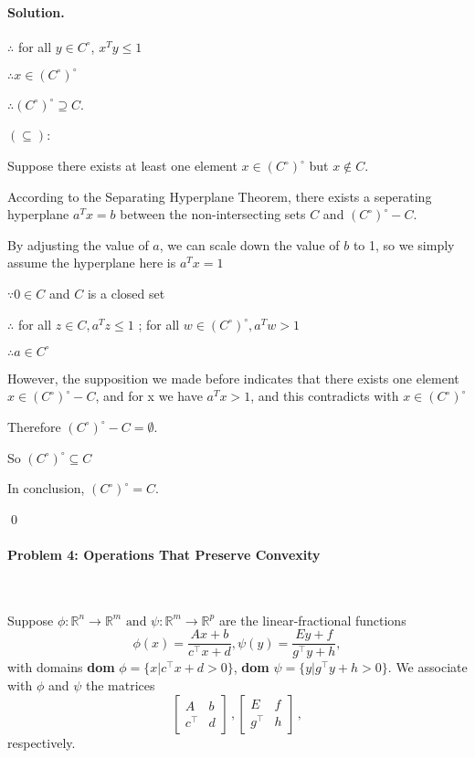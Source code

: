 \documentclass[a4paper]{article}
\newenvironment{solution}
{\color{blue} \paragraph{Solution.}}
{\newline \qed}
\begin{document}
\begin{solution}
\begin{enumerate}[a)]
\begin{enumerate}[1)]
                $\therefore $ for all $y\in C^\circ$, $x^Ty\leq 1$

                $\therefore x\in (C^\circ)^\circ$

                $\therefore (C^\circ)^\circ \supseteq C$.

                $(\subseteq)$:

                Suppose there exists at least one element $x \in (C^\circ)^\circ$ but $x\not \in C$.

                According to the Separating Hyperplane Theorem, there exists a seperating hyperplane $a^Tx=b$ between the non-intersecting sets $C$ and $(C^\circ)^\circ-C$.

                By adjusting the value of $a$, we can scale down the value of $b$ to 1, so we simply assume the hyperplane here is $a^Tx=1$

                $\because 0\in C$ and $C$ is a closed set

                $\therefore$ for all $z\in C, a^Tz\leq 1$ ; for all $w \in (C^\circ)^\circ, a^Tw > 1$ 

                $\therefore a\in C^\circ$

                However, the supposition we made before indicates that there exists one element $x\in (C^\circ)^\circ-C$, and for x we have $a^Tx > 1$, and this contradicts with $x\in (C^\circ)^\circ$

                Therefore $(C^\circ)^\circ-C=\emptyset$.

                So $(C^\circ)^\circ\subseteq C$

                In conclusion, $(C^\circ)^\circ=C$.


            \end{enumerate}
    \end{enumerate}
\end{solution}

\paragraph{Problem 4: Operations That Preserve Convexity}
~

Suppose $\phi : \mathbb{R}^n \rightarrow \mathbb{R}^m \text{ and } \psi : \mathbb{R}^m \rightarrow \mathbb{R}^p$ are the linear-fractional functions
\begin{equation}
\phi(x) = \frac{Ax+b}{c^\top x + d}, \psi(y) = \frac{Ey+f}{g^\top y + h},
\end{equation}
with domains \textbf{dom }$\phi = \{ x | c^\top x + d > 0 \}$, \textbf{dom }$\psi = \{ y | g^\top y + h > 0 \}$. We associate with $\phi$ and $\psi$ the matrices
\begin{equation}
  \left[\begin{matrix}
   A & b \\
   c^\top & d
  \end{matrix}\right]\,,
  \left[\begin{matrix}
   E & f \\
   g^\top & h
  \end{matrix}\right]\,,
\end{equation}
respectively.
\end{document}
